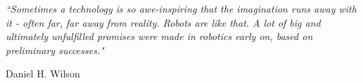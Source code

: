 
\pagestyle{empty} %

\null\vfill %

\textit{``Sometimes a technology is so awe-inspiring that the imagination runs away with it - often far, far away from reality. Robots are like that. A lot of big and ultimately unfulfilled promises were made in robotics early on, based on preliminary successes."}

\begin{flushright}
Daniel H. Wilson
\end{flushright}

\vfill\vfill\vfill\vfill\vfill\vfill\null %

\clearpage %